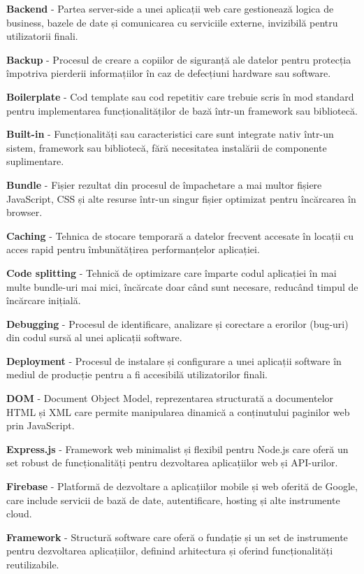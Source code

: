 \documentclass[12pt,a4paper]{report}
\begin{document}
\textbf{Backend} - Partea server-side a unei aplicații web care gestionează logica de business, bazele de date și comunicarea cu serviciile externe, invizibilă pentru utilizatorii finali.

\textbf{Backup} - Procesul de creare a copiilor de siguranță ale datelor pentru protecția împotriva pierderii informațiilor în caz de defecțiuni hardware sau software.

\textbf{Boilerplate} - Cod template sau cod repetitiv care trebuie scris în mod standard pentru implementarea funcționalităților de bază într-un framework sau bibliotecă.

\textbf{Built-in} - Funcționalități sau caracteristici care sunt integrate nativ într-un sistem, framework sau bibliotecă, fără necesitatea instalării de componente suplimentare.

\textbf{Bundle} - Fișier rezultat din procesul de împachetare a mai multor fișiere JavaScript, CSS și alte resurse într-un singur fișier optimizat pentru încărcarea în browser.

\textbf{Caching} - Tehnica de stocare temporară a datelor frecvent accesate în locații cu acces rapid pentru îmbunătățirea performanțelor aplicației.

\textbf{Code splitting} - Tehnică de optimizare care împarte codul aplicației în mai multe bundle-uri mai mici, încărcate doar când sunt necesare, reducând timpul de încărcare inițială.

\textbf{Debugging} - Procesul de identificare, analizare și corectare a erorilor (bug-uri) din codul sursă al unei aplicații software.

\textbf{Deployment} - Procesul de instalare și configurare a unei aplicații software în mediul de producție pentru a fi accesibilă utilizatorilor finali.

\textbf{DOM} - Document Object Model, reprezentarea structurată a documentelor HTML și XML care permite manipularea dinamică a conținutului paginilor web prin JavaScript.


\textbf{Express.js} - Framework web minimalist și flexibil pentru Node.js care oferă un set robust de funcționalități pentru dezvoltarea aplicațiilor web și API-urilor.

\textbf{Firebase} - Platformă de dezvoltare a aplicațiilor mobile și web oferită de Google, care include servicii de bază de date, autentificare, hosting și alte instrumente cloud.

\textbf{Framework} - Structură software care oferă o fundație și un set de instrumente pentru dezvoltarea aplicațiilor, definind arhitectura și oferind funcționalități reutilizabile.
\end{document}

